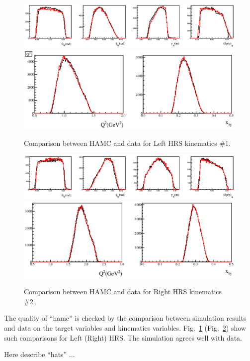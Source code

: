 \begin{figure}[!p]
\centering
\includegraphics{DW/compl_tg.eps}
\includegraphics{DW/compl_Qx.eps}
\caption{Comparison between HAMC and data for Left HRS kinematics \#1.}\label{fig:hamc_compl}
\end{figure}

\begin{figure}[!p]
\centering
\includegraphics{DW/compr_tg.eps}
\includegraphics{DW/compr_Qx.eps}
\caption{Comparison between HAMC and data for Right HRS kinematics \#2.}\label{fig:hamc_compr}
\end{figure}

The quality of ``hamc'' is checked by the comparison between simulation results and data on the target variables and kinematics variables. Fig.~\ref{fig:hamc_compl} (Fig.~\ref{fig:hamc_compr}) show such comparisons for Left (Right) HRS. The simulation agrees well with data. 

Here describe ``hats'' ...

